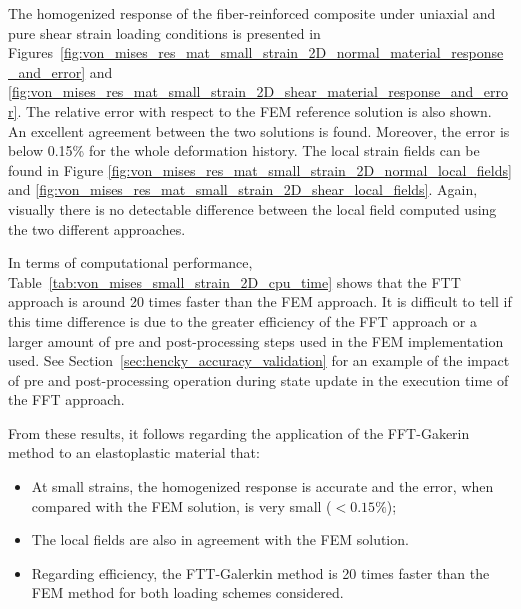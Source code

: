 The homogenized response of the fiber-reinforced composite under uniaxial and pure shear strain loading conditions is presented in Figures~\ref{fig:von_mises_res_mat_small_strain_2D_normal_material_response_and_error} and \ref{fig:von_mises_res_mat_small_strain_2D_shear_material_response_and_error}.
The relative error with respect to the FEM reference solution is also shown.
An excellent agreement between the two solutions is found.
Moreover, the error is below 0.15\% for the whole deformation history.
The local strain fields can be found in Figure \ref{fig:von_mises_res_mat_small_strain_2D_normal_local_fields} and \ref{fig:von_mises_res_mat_small_strain_2D_shear_local_fields}.
Again, visually there is no detectable difference between the local field computed using the two different approaches.

In terms of computational performance, Table~\ref{tab:von_mises_small_strain_2D_cpu_time} shows that the FTT approach is around 20 times faster than the FEM approach.
It is difficult to tell if this time difference is due to the greater efficiency of the FFT approach or a larger amount of pre and post-processing steps used in the FEM implementation used.
See Section~\ref{sec:hencky_accuracy_validation} for an example of the impact of pre and post-processing operation during state update in the execution time of the FFT approach.

From these results, it follows regarding the application of the FFT-Gakerin method to an elastoplastic material that:
\begin{itemize}
  \item At small strains, the homogenized response is accurate and the error, when compared with the FEM solution, is very small (\(<0.15\%\));
  \item The local fields are also in agreement with the FEM solution.
  \item Regarding efficiency, the FTT-Galerkin method is 20 times faster than the FEM method for both loading schemes considered.
\end{itemize}

